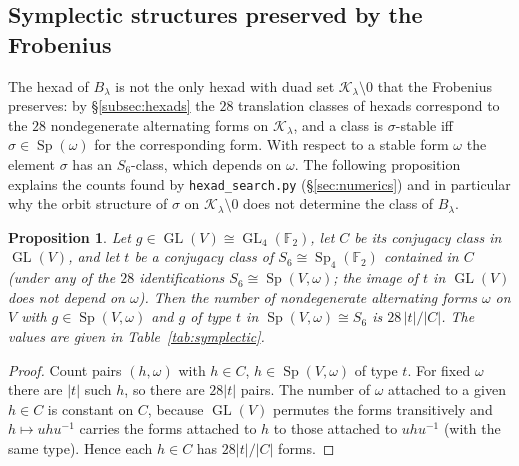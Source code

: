 ﻿\documentclass[12pt,a4paper]{amsart}
\newtheorem{proposition}[theorem]{Proposition}
\theoremstyle{definition}
\newcommand{\F}{\mathbb{F}}
\newcommand{\Sp}{\operatorname{Sp}}
\newcommand{\GL}{\operatorname{GL}}
\newcommand{\Kk}{\mathcal{K}}
\begin{document}
\subsection{Symplectic structures preserved by the Frobenius}\label{subsec:symplectic}
The hexad of $B_\lambda$ is not the only hexad with duad set $\Kk_\lambda\setminus0$ that the Frobenius preserves: by \S\ref{subsec:hexads} the $28$ translation classes of hexads correspond to the $28$ nondegenerate alternating forms on $\Kk_\lambda$, and a class is $\sigma$-stable iff $\sigma\in\Sp(\omega)$ for the corresponding form. With respect to a stable form $\omega$ the element $\sigma$ has an $S_6$-class, which depends on $\omega$. The following proposition explains the counts found by \texttt{hexad\_search.py} (\S\ref{sec:numerics}) and in particular why the orbit structure of $\sigma$ on $\Kk_\lambda\setminus0$ does not determine the class of $B_\lambda$.

\begin{proposition}\label{prop:symplectic}
Let $g\in\GL(V)\cong\GL_4(\F_2)$, let $C$ be its conjugacy class in $\GL(V)$, and let $t$ be a conjugacy class of $S_6\cong\Sp_4(\F_2)$ contained in $C$ (under any of the $28$ identifications $S_6\cong\Sp(V,\omega)$; the image of $t$ in $\GL(V)$ does not depend on $\omega$). Then the number of nondegenerate alternating forms $\omega$ on $V$ with $g\in\Sp(V,\omega)$ and $g$ of type $t$ in $\Sp(V,\omega)\cong S_6$ is $28\,|t|/|C|$. The values are given in Table~\ref{tab:symplectic}.
\end{proposition}
\begin{proof}
Count pairs $(h,\omega)$ with $h\in C$, $h\in\Sp(V,\omega)$ of type $t$. For fixed $\omega$ there are $|t|$ such $h$, so there are $28|t|$ pairs. The number of $\omega$ attached to a given $h\in C$ is constant on $C$, because $\GL(V)$ permutes the forms transitively and $h\mapsto uhu^{-1}$ carries the forms attached to $h$ to those attached to $uhu^{-1}$ (with the same type). Hence each $h\in C$ has $28|t|/|C|$ forms.
\end{proof}
\end{document}
